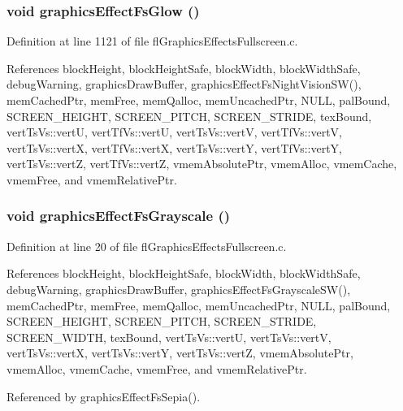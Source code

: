 \subsubsection{\setlength{\rightskip}{0pt plus 5cm}void graphics\-Effect\-Fs\-Glow ()}\label{flGraphicsEffectsFullscreen_8c_d46c5e3e0ab2edd95dc6a95b8e90a249}




Definition at line 1121 of file fl\-Graphics\-Effects\-Fullscreen.c.

References block\-Height, block\-Height\-Safe, block\-Width, block\-Width\-Safe, debug\-Warning, graphics\-Draw\-Buffer, graphics\-Effect\-Fs\-Night\-Vision\-SW(), mem\-Cached\-Ptr, mem\-Free, mem\-Qalloc, mem\-Uncached\-Ptr, NULL, pal\-Bound, SCREEN\_\-HEIGHT, SCREEN\_\-PITCH, SCREEN\_\-STRIDE, tex\-Bound, vert\-Ts\-Vs::vert\-U, vert\-Tf\-Vs::vert\-U, vert\-Ts\-Vs::vert\-V, vert\-Tf\-Vs::vert\-V, vert\-Ts\-Vs::vert\-X, vert\-Tf\-Vs::vert\-X, vert\-Ts\-Vs::vert\-Y, vert\-Tf\-Vs::vert\-Y, vert\-Ts\-Vs::vert\-Z, vert\-Tf\-Vs::vert\-Z, vmem\-Absolute\-Ptr, vmem\-Alloc, vmem\-Cache, vmem\-Free, and vmem\-Relative\-Ptr.
\subsubsection{\setlength{\rightskip}{0pt plus 5cm}void graphics\-Effect\-Fs\-Grayscale ()}\label{flGraphicsEffectsFullscreen_8c_f54c150ec57fe3f301804e0ce752d064}




Definition at line 20 of file fl\-Graphics\-Effects\-Fullscreen.c.

References block\-Height, block\-Height\-Safe, block\-Width, block\-Width\-Safe, debug\-Warning, graphics\-Draw\-Buffer, graphics\-Effect\-Fs\-Grayscale\-SW(), mem\-Cached\-Ptr, mem\-Free, mem\-Qalloc, mem\-Uncached\-Ptr, NULL, pal\-Bound, SCREEN\_\-HEIGHT, SCREEN\_\-PITCH, SCREEN\_\-STRIDE, SCREEN\_\-WIDTH, tex\-Bound, vert\-Ts\-Vs::vert\-U, vert\-Ts\-Vs::vert\-V, vert\-Ts\-Vs::vert\-X, vert\-Ts\-Vs::vert\-Y, vert\-Ts\-Vs::vert\-Z, vmem\-Absolute\-Ptr, vmem\-Alloc, vmem\-Cache, vmem\-Free, and vmem\-Relative\-Ptr.

Referenced by graphics\-Effect\-Fs\-Sepia().
